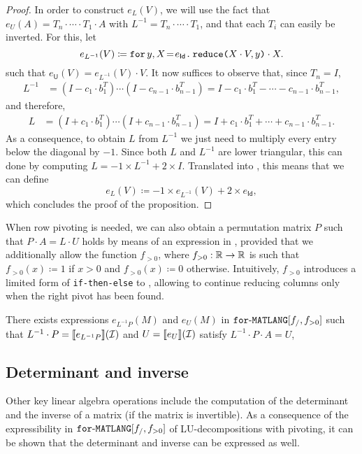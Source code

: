 \begin{proof}
In order to construct $e_L(V)$, we will use the fact that $e_U(A)=T_n\cdot\cdots\cdot T_1\cdot A$ with $L^{-1}=T_n\cdot\cdots\cdot T_1$, and that each $T_i$ can easily be inverted. For this, let
    $$
    e_{L^{-1}}(V) \coloneqq    \initf{e_{\mathsf{Id}}}{y}{X}{\red{X\cdot V}{y}\cdot X}.
    $$
    such that	$e_{\mathsf{U}}(V)=  e_{L^{-1}}(V) \cdot V$. It now suffices to observe that, since $T_n=I$,
    \begin{align*}
    L^{-1}&=(I-c_1\cdot b_1^T)\cdots (I-c_{n-1}\cdot  b_{n-1}^T)
    =I-c_1\cdot b_1^T-\cdots - c_{n-1}\cdot b_{n-1}^T,
    \end{align*}
and therefore,    
    \begin{align*}
    L&=(I+c_1\cdot b_1^T)\cdots (I+c_{n-1}\cdot b_{n-1}^T) =I+c_1\cdot b_1^T+\cdots + c_{n-1}\cdot b_{n-1}^T.
    \end{align*}
    As a consequence, to obtain $L$ from $L^{-1}$ we just need to multiply every entry below the diagonal by $-1$. Since both  $L$ and $L^{-1}$ are lower triangular, this can done 
    by computing $L=-1\times L^{-1} + 2\times I$. Translated into \langfor, this means that we can define
    $$
    e_{L}(V) \coloneqq    -1\times e_{L^{-1}}(V) + 2\times e_{\mathsf{Id}},
    $$
    which concludes the proof of the proposition.    
\end{proof}

When row pivoting is needed, we can also obtain a permutation matrix
$P$ such that $P\cdot A=L\cdot U$ holds by means of an expression in \langfor, provided
that we additionally allow the function $f_{>0}$, 
where $f_{>0}:\RR\to\RR$ is such that $f_{>0}(x)\coloneqq  1$ if $x>0$ and $f_{>0}(x)\coloneqq  0$ otherwise.
Intuitively, $f_{>0}$ introduces a limited form of \texttt{if-then-else} to \langfor, allowing to continue reducing columns only when the right pivot has been found.

\begin{proposition}\label{prop:palu}
There exists expressions $e_{L^{-1}P}(M)$ and $e_U(M)$ in $\langforf{f_/,f_{>0}}$ such that
$L^{-1}\cdot P=\sem{e_{L^{-1}P}}{\I}$ and $U=\sem{e_U}{\I}$ satisfy $L^{-1}\cdot P\cdot A=U$,
\end{proposition}




\subsection{Determinant and inverse}\label{sec:queries:inverse}
Other key linear algebra operations include the computation of the determinant and
the inverse of a matrix (if the matrix is invertible). As a consequence of the expressibility
in $\langforf{f_/,f_{>0}}$ of LU-decompositions with pivoting, it can be shown that the determinant
and inverse can be expressed as well. 

